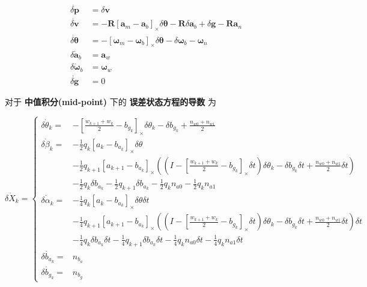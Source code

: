 \documentclass[12pt,a4paper]{article}
\begin{document}
\begin{equation}
\begin{aligned}
\dot{\delta \mathbf{p}} &= \delta \mathbf{v} \\
\dot{\delta \mathbf{v}} &= -\mathbf{R}\left[\mathbf{a}_{m}-\mathbf{a}_{b}\right]_{ \times} \delta \boldsymbol{\theta}-\mathbf{R} \delta \mathbf{a}_{b}+\delta \mathbf{g}-\mathbf{R} \mathbf{a}_{n} \\
\dot{\delta \boldsymbol{\theta}} &= -\left[\boldsymbol{\omega}_{m}-\boldsymbol{\omega}_{b}\right]_{ \times} \delta \boldsymbol{\theta}-\delta \boldsymbol{\omega}_{b}-\boldsymbol{\omega}_{n} \\
\delta \dot{\mathbf{a}}_{b} &= \mathbf{a}_{w} \\ 
\delta \dot{\boldsymbol{\omega}}_{b} &= \boldsymbol{\omega}_{w} \\ 
\dot{\delta \mathbf{g}} &= 0 
\end{aligned}
\end{equation}

对于 \textbf{中值积分(mid-point)} 下的 \textbf{误差状态方程的导数} 为  

\begin{equation}
\dot{\delta X_k} =
\begin{cases}
\dot{\delta \theta_{k}} =&
-[\frac{w_{k+1}+w_{k}}{2}-b_{g_{k}}]_{\times} \delta \theta_{k}-\delta b_{g_{k}}+\frac{n_{w0}+n_{w1}}{2} \\
\dot{\delta\beta_{k}} =&
-\frac{1}{2}q_{k}[a_{k}-b_{a_{k}}]_{\times}\delta \theta \\
&-\frac{1}{2}q_{k+1}[a_{k+1}-b_{a_{k}}]_{\times}((I-[\frac{w_{k+1}+w_{k}}{2}-b_{g_{k}}]_{\times }\delta t) \delta \theta_{k} -\delta b_{g_{k}}\delta t+\frac{n_{w0}+n_{w1}}{2}\delta t) \\
&-\frac{1}{2}q_{k}\delta b_{a_{k}}-\frac{1}{2}q_{k+1}\delta b_{a_{k}}-\frac{1}{2}q_{k}n_{a0}-\frac{1}{2}q_{k}n_{a1} \\
\dot{\delta\alpha_{k}} =&
-\frac{1}{4}q_{k}[a_{k}-b_{a_{k}}]_{\times}\delta \theta\delta t \\
&-\frac{1}{4}q_{k+1}[a_{k+1}-b_{a_{k}}]_{\times}((I-[\frac{w_{k+1}+w_{k}}{2}-b_{g_{k}}]_{\times }\delta t) \delta \theta _{k} -\delta b_{g_{k}}\delta t+\frac{n_{w0}+n_{w1}}{2}\delta t)\delta t \\
&-\frac{1}{4}q_{k}\delta b_{a_{k}}\delta t-\frac{1}{4}q_{k+1}\delta b_{a_{k}}\delta t-\frac{1}{4}q_{k}n_{a0}\delta t-\frac{1}{4}q_{k}n_{a1}\delta t \\
\dot{\delta b_{a_k}} =&  n_{b_a} \\
\dot{\delta b_{g_k}} =&  n_{b_g}
\end{cases}
\end{equation}
\end{document}
